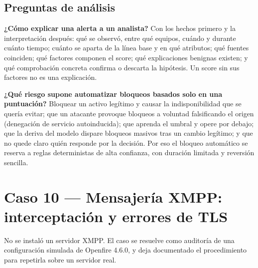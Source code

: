 \subsection{Preguntas de análisis}

\textbf{¿Cómo explicar una alerta a un analista?} Con los hechos primero y la interpretación después: qué se observó, entre qué equipos, cuándo y durante cuánto tiempo; cuánto se aparta de la línea base y en qué atributos; qué fuentes coinciden; qué factores componen el score; qué explicaciones benignas existen; y qué comprobación concreta confirma o descarta la hipótesis. Un score sin sus factores no es una explicación.

\textbf{¿Qué riesgo supone automatizar bloqueos basados solo en una puntuación?} Bloquear un activo legítimo y causar la indisponibilidad que se quería evitar; que un atacante provoque bloqueos a voluntad falsificando el origen (denegación de servicio autoinducida); que aprenda el umbral y opere por debajo; que la deriva del modelo dispare bloqueos masivos tras un cambio legítimo; y que no quede claro quién responde por la decisión. Por eso el bloqueo automático se reserva a reglas deterministas de alta confianza, con duración limitada y reversión sencilla.

\section{Caso 10 --- Mensajería XMPP: interceptación y errores de TLS}


No se instaló un servidor XMPP. El caso se resuelve como auditoría de una configuración simulada de Openfire 4.6.0, y deja documentado el procedimiento para repetirla sobre un servidor real.


